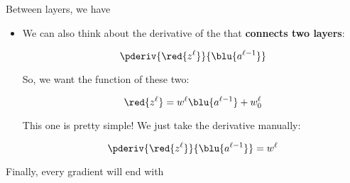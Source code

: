     Between layers, we have
        
        \begin{itemize}
            
            \item We can also think about the derivative of the  that \textbf{connects two layers}:
            
                \begin{equation}
                    \pderiv {\red{z^\ell}}   {\blu{a^{\ell-1}}}
                \end{equation}
                
                So, we want the function of these two:
                
                \begin{equation}
                    \red{z^\ell} = w^\ell \blu{ a^{\ell-1} } + w_0^\ell
                \end{equation}
                
                This one is pretty simple! We just take the derivative manually:
                
                \begin{equation}
                    \pderiv {\red{z^\ell}}   {\blu{a^{\ell-1}}}
                    =
                    w^{\ell}
                \end{equation}
                
        \end{itemize}
        
    Finally, every gradient will end with
        
